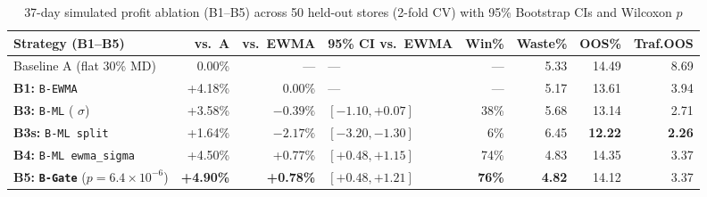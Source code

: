 \begin{table}[H]
\centering
\caption{37-day simulated profit ablation (B1--B5) across 50 held-out stores (2-fold CV) with 95\% Bootstrap CIs and Wilcoxon $p$}
\label{tab:ops_chest_backtest}
\footnotesize
\setlength{\tabcolsep}{3pt}
\begin{tabularx}{\textwidth}{Y r r L{2.35cm} r r r r}
\toprule
\textbf{Strategy (B1--B5)} & \textbf{vs.\ A} & \textbf{vs.\ EWMA} & \textbf{95\% CI vs.\ EWMA} & \textbf{Win\%} & \textbf{Waste\%} & \textbf{OOS\%} & \textbf{Traf.OOS} \\
\midrule
Baseline A (flat 30\% MD) & 0.00\% & --- & --- & --- & 5.33 & 14.49 & 8.69 \\
\textbf{B1:} \texttt{B-EWMA} & +4.18\% & 0.00\% & --- & --- & 5.17 & 13.61 & 3.94 \\
\textbf{B3:} \texttt{B-ML} ( $\sigma$) & +3.58\% & $-0.39\%$ & $[-1.10, +0.07]$ & 38\% & 5.68 & 13.14 & 2.71 \\
\textbf{B3s:} \texttt{B-ML split} & +1.64\% & $-2.17\%$ & $[-3.20, -1.30]$ & 6\% & 6.45 & \textbf{12.22} & \textbf{2.26} \\
\textbf{B4:} \texttt{B-ML ewma\_sigma} & +4.50\% & +0.77\% & $[+0.48, +1.15]$ & 74\% & 4.83 & 14.35 & 3.37 \\
\textbf{B5:} \textbf{\texttt{B-Gate}} ($p=6.4\times 10^{-6}$) & \textbf{+4.90\%} & \textbf{+0.78\%} & \textbf{$[+0.48, +1.21]$} & \textbf{76\%} & \textbf{4.82} & 14.12 & 3.37 \\
\bottomrule
\end{tabularx}
\end{table}

